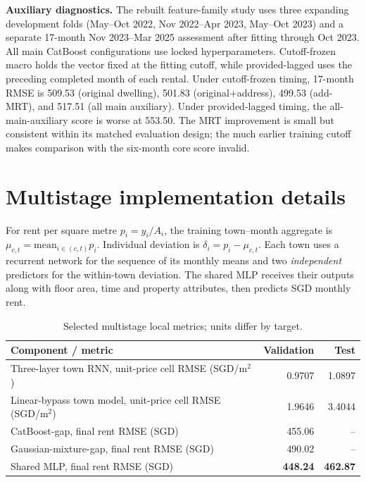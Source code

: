 \documentclass[10pt,a4paper]{article}
\begin{document}
\textbf{Auxiliary diagnostics.} The rebuilt feature-family study uses three expanding development folds (May--Oct 2022, Nov 2022--Apr 2023, May--Oct 2023) and a separate 17-month Nov 2023--Mar 2025 assessment after fitting through Oct 2023. All main CatBoost configurations use locked hyperparameters. Cutoff-frozen macro holds the vector fixed at the fitting cutoff, while provided-lagged uses the preceding completed month of each rental. Under cutoff-frozen timing, 17-month RMSE is 509.53 (original dwelling), 501.83 (original+address), 499.53 (add-MRT), and 517.51 (all main auxiliary). Under provided-lagged timing, the all-main-auxiliary score is worse at 553.50. The MRT improvement is small but consistent within its matched evaluation design; the much earlier training cutoff makes comparison with the six-month core score invalid.

\section{Multistage implementation details}\label{app:stack}
For rent per square metre $p_i=y_i/A_i$, the training town--month aggregate is $\mu_{c,t}=\mathrm{mean}_{i\in(c,t)}p_i$. Individual deviation is $\delta_i=p_i-\mu_{c,t}$. Each town uses a recurrent network for the sequence of its monthly means and two \emph{independent} predictors for the within-town deviation. The shared MLP receives their outputs along with floor area, time and property attributes, then predicts SGD monthly rent.

\begin{table}[htbp]\centering\small
\caption{Selected multistage local metrics; units differ by target.}\label{tab:stack-short}
\begin{tabularx}{\linewidth}{@{}Xrr@{}}\toprule Component / metric & Validation & Test\\\midrule
Three-layer town RNN, unit-price cell RMSE (SGD/m$^2$) & 0.9707 & 1.0897\\
Linear-bypass town model, unit-price cell RMSE (SGD/m$^2$) & 1.9646 & 3.4044\\
CatBoost-gap, final rent RMSE (SGD) & 455.06 & --\\
Gaussian-mixture-gap, final rent RMSE (SGD) & 490.02 & --\\
Shared MLP, final rent RMSE (SGD) & \textbf{448.24} & \textbf{462.87}\\\bottomrule\end{tabularx}\end{table}
\end{document}
